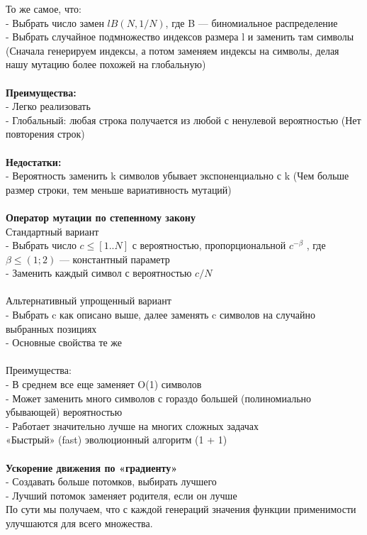 То же самое, что: \\
- Выбрать число замен $l  B(N,1/N)$, где B — биномиальное распределение  \\
- Выбрать случайное подмножество индексов размера l и заменить там символы (Сначала генерируем индексы, а потом заменяем индексы на символы, делая нашу мутацию более похожей на глобальную)\\
\\
\textbf{Преимущества: \\}
 - Легко реализовать \\
 - Глобальный: любая строка получается из любой с ненулевой вероятностью (Нет повторения строк) \\
\\
\textbf{Недостатки: \\}
 - Вероятность заменить k символов убывает экспоненциально с k (Чем больше размер строки, тем меньше вариативность мутаций)\\
\\
\textbf{Оператор мутации по степенному закону \\}
Стандартный вариант \\
- Выбрать число $c \le [1..N]$ с вероятностью, пропорциональной $c ^ {- \beta}$ , где $\beta \le (1;2)$ — константный параметр \\
- Заменить каждый символ с вероятностью $c/N$\\ 
\\
Альтернативный  упрощенный  вариант \\
- Выбрать c как описано выше, далее заменять c символов на случайно выбранных позициях \\
- Основные свойства те же \\
\\
Преимущества: \\
- В среднем все еще заменяет O(1) символов\\
- Может заменить много символов с гораздо большей (полиномиально убывающей) вероятностью \\
- Работает значительно лучше на многих сложных задачах \\
«Быстрый» (fast) эволюционный алгоритм (1 + 1)\\
\\
\textbf{Ускорение движения по «градиенту»} \\
- Создавать больше потомков, выбирать лучшего \\
- Лучший потомок заменяет родителя, если он лучше \\
По сути мы получаем, что с каждой генераций значения функции применимости улучшаются для всего множества. \\
